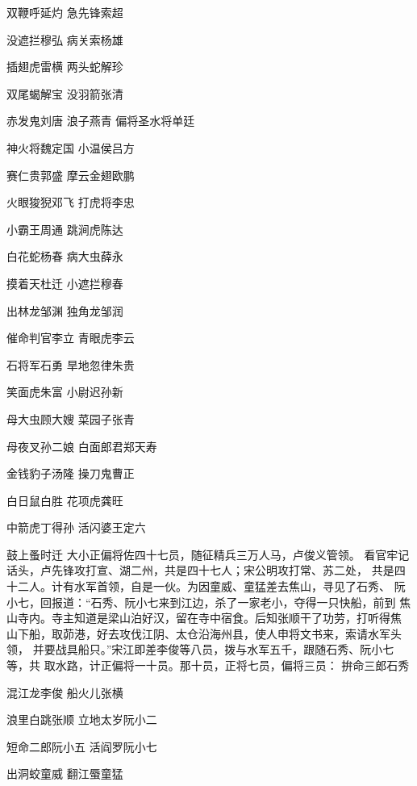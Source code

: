 双鞭呼延灼
急先锋索超


没遮拦穆弘
病关索杨雄


插翅虎雷横
两头蛇解珍


双尾蝎解宝
没羽箭张清


赤发鬼刘唐
浪子燕青
偏将圣水将单廷

神火将魏定国
小温侯吕方


赛仁贵郭盛
摩云金翅欧鹏

火眼狻猊邓飞
打虎将李忠


小霸王周通
跳涧虎陈达


白花蛇杨春
病大虫薛永


摸着天杜迁
小遮拦穆春


出林龙邹渊
独角龙邹润


催命判官李立
青眼虎李云


石将军石勇
旱地忽律朱贵

笑面虎朱富
小尉迟孙新


母大虫顾大嫂
菜园子张青


母夜叉孙二娘
白面郎君郑天寿

金钱豹子汤隆
操刀鬼曹正


白日鼠白胜
花项虎龚旺


中箭虎丁得孙
活闪婆王定六

鼓上蚤时迁
大小正偏将佐四十七员，随征精兵三万人马，卢俊义管领。
看官牢记话头，卢先锋攻打宣、湖二州，共是四十七人；宋公明攻打常、苏二处，
共是四十二人。计有水军首领，自是一伙。为因童威、童猛差去焦山，寻见了石秀、
阮小七，回报道：“石秀、阮小七来到江边，杀了一家老小，夺得一只快船，前到
焦山寺内。寺主知道是梁山泊好汉，留在寺中宿食。后知张顺干了功劳，打听得焦
山下船，取茆港，好去攻伐江阴、太仓沿海州县，使人申将文书来，索请水军头领，
并要战具船只。”宋江即差李俊等八员，拨与水军五千，跟随石秀、阮小七等，共
取水路，计正偏将一十员。那十员，正将七员，偏将三员：
拚命三郎石秀

混江龙李俊
船火儿张横


浪里白跳张顺
立地太岁阮小二

短命二郎阮小五
活阎罗阮小七

出洞蛟童威
翻江蜃童猛


